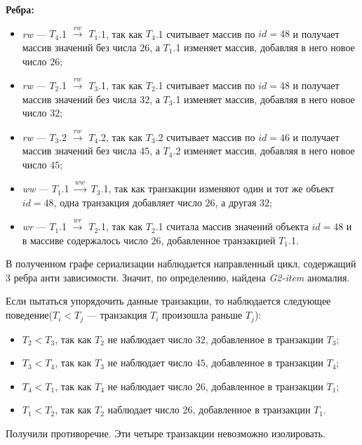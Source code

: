 \documentclass[12pt,  openany]{book}
\begin{document}
\par \textbf{Ребра:}
\begin{itemize}
\item \textit{rw} --- \textbf{$T_4$}.1 $ \xrightarrow{\textit{rw}}$  \textbf{$T_1$}.1,  так как \textbf{$T_4$}.1 считывает массив по $id=48$ и получает массив значений без числа $26$, а \textbf{$T_1$}.1 изменяет массив, добавляя в него новое число $26$;
\item \textit{rw} --- \textbf{$T_2$}.1 $ \xrightarrow{\textit{rw}}$  \textbf{$T_3$}.1,  так как \textbf{$T_2$}.1 считывает массив по $id=48$ и получает массив значений без числа $32$, а \textbf{$T_3$}.1 изменяет массив, добавляя в него новое число $32$;
\item \textit{rw} --- \textbf{$T_3$}.2 $ \xrightarrow{\textit{rw}}$  \textbf{$T_4$}.2,  так как \textbf{$T_3$}.2 считывает массив по $id=46$ и получает массив значений без числа $45$, а \textbf{$T_4$}.2 изменяет массив, добавляя в него новое число $45$;
\item \textit{ww} --- \textbf{$T_1$}.1 $ \xrightarrow{\textit{ww}}$  \textbf{$T_3$}.1, так как транзакции изменяют один и тот же объект $id=48$, одна транзакция добавляет число $26$, а другая $32$;
\item \textit{wr} --- \textbf{$T_1$}.1 $ \xrightarrow{\textit{wr}}$  \textbf{$T_2$}.1, так как \textbf{$T_2$}.1 считала массив значений объекта $id=48$ и в массиве содержалось число $26$, добавленное транзакцией \textbf{$T_1$}.1.
\end{itemize}
В полученном графе сериализации наблюдается направленный цикл, содержащий 3 ребра анти зависимости. Значит, по определению, найдена \textit{G2-item} аномалия.
\par Если пытаться упорядочить данные транзакции, то наблюдается следующее поведение($T_i<T_j$ --- транзакция $T_i$ произошла раньше $T_j$):
\begin{itemize}
\item $T_2 < T_3$, так как $T_2$ не наблюдает число $32$, добавленное в транзакции $T_3$; 
\item $T_3 < T_4$, так как $T_3$ не наблюдает число $45$, добавленное в транзакции $T_4$; 
\item $T_4 < T_1$, так как $T_4$ не наблюдает число $26$, добавленное в транзакции $T_1$;
\item $T_1 < T_2$, так как $T_2$ наблюдает число $26$, добавленное в транзакции $T_1$.  
\end{itemize}
Получили противоречие. Эти четыре транзакции невозможно изолировать.
\end{document}

